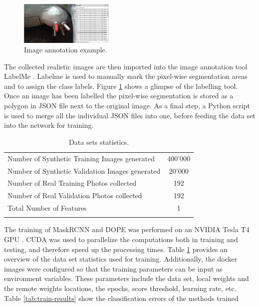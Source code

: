 \begin{figure}[h]
    \centering
    \includegraphics[width=0.4\textwidth]{images/cow_labelme.png}
    \caption{Image annotation example.}
    \label{fig:cow_labelme}
\end{figure}
The collected realistic images are then imported into the image annotation tool LabelMe \cite{2021labelme}. Labelme is used to manually mark the pixel-wise segmentation areas and to assign the class labels.  Figure \ref{fig:cow_labelme} shows a glimpse of the labelling tool. Once an image has been labelled the pixel-wise segmentation is stored as a polygon in JSON file next to the original image. As a final step, a Python script is used to merge all the individual JSON files into one, before feeding the data set into the network for training.

\begin{longtable}{@{} p{8cm} c @{}} \toprule
Number of Synthetic Training Images generated                   & 400'000 \\ \cmidrule{1-2}
Number of Synthetic Validation Images generated                   & 20'000 \\ \cmidrule{1-2}
Number of Real Training Photos collected             & 192 \\ \cmidrule{1-2}
Number of Real Validation Photos collected             & 192 \\ \cmidrule{1-2}
Total Number of Features                    & 1 \\ \bottomrule
\caption{Data sets statistics.} \label{tab:dataset-statistics} \\
\end{longtable}

The training of MaskRCNN and DOPE was performed on an NVIDIA Tesla T4 GPU \cite{2021testat4}.
CUDA \cite{2021nvidia-cuda} was used to parallelize the computations both in training and testing, and therefore speed up the processing times. Table \ref{tab:dataset-statistics} provides an overview of the data set statistics used for training. 
Additionally, the docker images were configured so that the training parameters can be input as environment variables. These parameters include the data set, local weights and the remote weights locations, the epochs, score threshold, learning rate, etc. Table \ref{tab:train-results} show the classification errors of the methods trained

